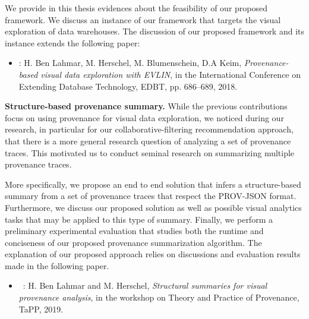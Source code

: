 We provide in this thesis evidences about the feasibility of our proposed framework. 
We discuss an instance of our framework that targets the visual exploration of data warehouses. 
The discussion of our proposed framework and its instance extends the following paper:
\begin{itemize}
\item \cite{BHBK18:Demo}: H. Ben Lahmar, M. Herschel, M. Blumenschein, D.A  Keim, \emph{Provenance-based visual data exploration with EVLIN}, in the International Conference on Extending Database Technology, EDBT, pp. 686--689, 2018. 
\end{itemize}



 \bigskip
    \noindent \textbf {Structure-based provenance summary.} 
  While the previous contributions focus on using provenance for visual data exploration, we noticed during our research, in particular for our collaborative-filtering recommendation approach, that there is a more general research question of analyzing a set of provenance traces. 
    This motivated us to conduct seminal research on summarizing multiple provenance traces.

More specifically, we propose an end to end solution that infers a structure-based summary from a set of provenance traces that respect the PROV-JSON format. Furthermore, we discuss our proposed solution as well as possible visual analytics tasks that may be applied to this type of summary. Finally, we perform a preliminary experimental evaluation that studies both the runtime and conciseness of our proposed provenance summarization algorithm. 
 The explanation of our proposed approach relies on discussions and evaluation results made in the following paper.
\begin{itemize}
\item ~\cite{Houssem:19:TaPP}: H. Ben Lahmar and M. Herschel, \emph{Structural summaries for visual provenance analysis}, in the workshop on Theory and Practice of Provenance, TaPP, 2019.
\end{itemize}








